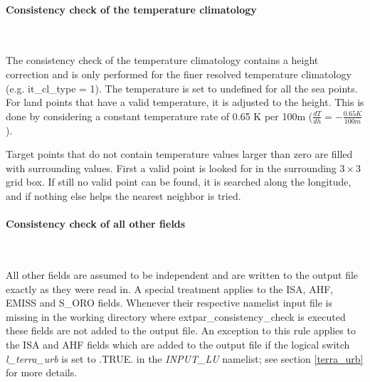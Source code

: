\documentclass[a4paper,10pt,DIV14,BCOR1cm,titlepage,twoside]{scrartcl}
\begin{document}
\paragraph{Consistency check of the temperature climatology}\ \par\medskip\noindent
The consistency check of the temperature climatology contains a height correction and is only performed for the finer resolved temperature climatology (e.g. it\_cl\_type = 1). The temperature is set to undefined for all the sea points. For land points that have a valid temperature, it is adjusted to the height. This is done by considering a constant temperature rate of 0.65 K per 100m ($\frac{dT}{dh} = -\frac{0.65 K}{100 m}$). \par\medskip\noindent
Target points that do not contain temperature values larger than zero are filled with surrounding values. First a valid point is looked for in the surrounding $3\times3$ grid box. If still no valid point can be found, it is searched along the longitude, and if nothing else helps the nearest neighbor is tried.
\paragraph{Consistency check of all other fields}\ \par\medskip\noindent
All other fields are assumed to be independent and are written to the output file exactly as they were read in. A special treatment applies to the ISA, AHF, EMISS and S\_ORO fields. Whenever their respective namelist input file is missing in the working directory where extpar\_consistency\_check is executed these fields are not added to the output file. An exception to this rule applies to the ISA and AHF fields which are added to the output file if the logical switch \textit{l\_terra\_urb} is set to .TRUE. in the \textit{INPUT\_LU} namelist; see section \ref{terra_urb} for more details.
\end{document}
